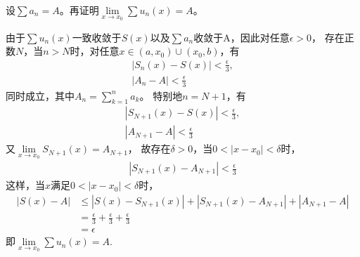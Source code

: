 \documentclass{article}
\begin{document}
设$\sum a_n = A$。再证明$\lim\limits_{x \to x_0} \sum u_n(x) = A$。

由于$\sum u_n(x)$一致收敛于$S(x)$以及$\sum a_n$收敛于A，因此对任意$\epsilon > 0$，
存在正数$N$，当$n > N$时，对任意$x \in (a, x_0) \cup (x_0, b)$，有
\begin{align*}
  |S_n(x) - S(x)| < \frac{\epsilon}{3}, \\
  |A_n - A| < \frac{\epsilon}{3}
\end{align*}
同时成立，其中$A_n = \sum \limits_{k = 1}^n a_k$。
特别地$n = N+1$，有
\begin{align*}
  |S_{N + 1}(x) - S(x)| < \frac{\epsilon}{3}, \\
  |A_{N + 1} - A| < \frac{\epsilon}{3}
\end{align*}
又$\lim\limits_{x \to x_0} S_{N + 1}(x) = A_{N + 1}$，
故存在$\delta > 0$，当$0 < |x - x_0| < \delta$时，
\begin{align*}
  |S_{N+1}(x) - A_{N + 1}| < \frac{\epsilon}{3}
\end{align*}
这样，当$x$满足$0 < |x - x_0| < \delta$时，
\begin{align*}
  |S(x) - A| & \leq |S(x) - S_{N + 1}(x)| + |S_{N + 1}(x) - A_{N + 1}| + |A_{N + 1} - A| \\
             & = \frac{\epsilon}{3} + \frac{\epsilon}{3} + \frac{\epsilon}{3} \\
             & = \epsilon
\end{align*}
即$\lim\limits_{x \to x_0} \sum u_n(x) = A$.
\end{document}
